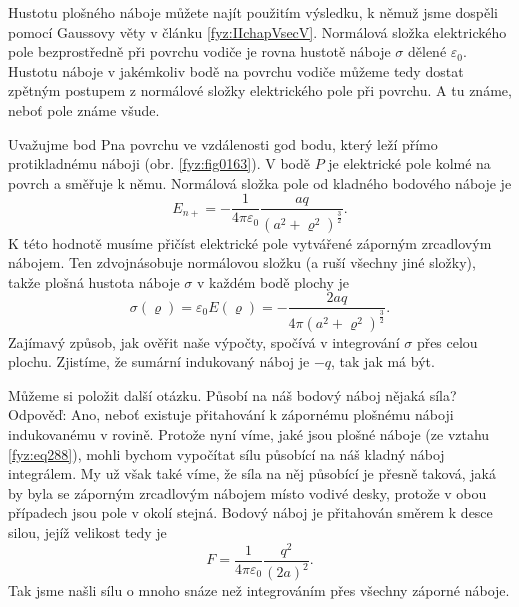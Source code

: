     Hustotu plošného náboje můžete najít použitím výsledku, k němuž jsme dospěli pomocí Gaussovy
    věty v článku \ref{fyz:IIchapVsecV}. Normálová složka elektrického pole bezprostředně při
    povrchu vodiče je rovna hustotě náboje \(\sigma\) dělené \(\varepsilon_0\). Hustotu náboje v
    jakémkoliv bodě na povrchu vodiče můžeme tedy dostat zpětným postupem z normálové složky
    elektrického pole při povrchu. A tu známe, neboť pole známe všude.
    
    Uvažujme bod Pna povrchu ve vzdálenosti god bodu, který leží přímo protikladnému náboji (obr.
    \ref{fyz:fig0163}). V bodě \(P\) je elektrické pole kolmé na povrch a směřuje k němu. Normálová
    složka pole od kladného bodového náboje je
    \begin{equation}\label{fyz:eq287}
     E_{n+} = -\dfrac{1}{4\pi\varepsilon_0}\frac{aq}{(a^2+\varrho^2)^{\frac{3}{2}}}.
    \end{equation}
    K této hodnotě musíme přičíst elektrické pole vytvářené záporným zrcadlovým nábojem. Ten
    zdvojnásobuje normálovou složku (a ruší všechny jiné složky), takže plošná hustota náboje
    \(\sigma\) v každém bodě plochy je
    \begin{equation}\label{fyz:eq288}
     \sigma(\varrho) = \varepsilon_0E(\varrho) = -\frac{2aq}{4\pi(a^2+\varrho^2)^{\frac{3}{2}}}.
    \end{equation} 
    Zajímavý způsob, jak ověřit naše výpočty, spočívá v integrování \(\sigma\) přes celou 
    plochu. Zjistíme, že sumární indukovaný náboj je \(-q\), tak jak má být. 
    
    Můžeme si položit další otázku. Působí na náš bodový náboj nějaká síla? Odpověď: Ano, neboť
    existuje přitahování k zápornému plošnému náboji indukovanému v rovině. Protože nyní víme, jaké 
    jsou plošné náboje (ze vztahu \ref{fyz:eq288}), mohli bychom vypočítat sílu působící na náš 
    kladný náboj integrálem. My už však také víme, že síla na něj působící je přesně taková, jaká 
    by byla se záporným zrcadlovým nábojem místo vodivé desky, protože v obou případech jsou pole v 
    okolí stejná. Bodový náboj je přitahován směrem k desce silou, jejíž velikost tedy je
    \begin{equation}\label{fyz:eq289}
     F = \dfrac{1}{4\pi\varepsilon_0}\frac{q^2}{(2a)^2}.
    \end{equation} 
    Tak jsme našli sílu o mnoho snáze než integrováním přes všechny záporné náboje.
    

